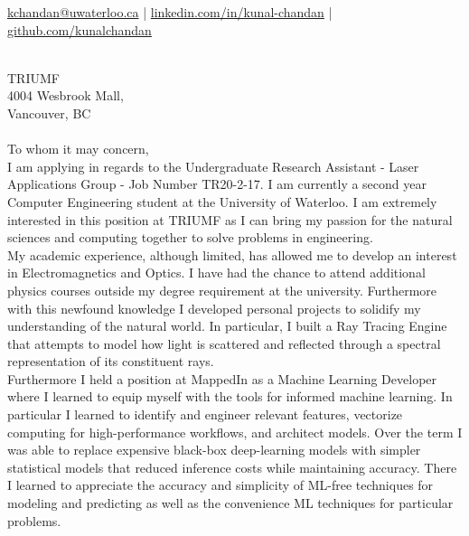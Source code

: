 \documentclass[]{chandan-cv}
\begin{document}
%
%

%
%
{
	\href{mailto:kchandan@uwaterloo.ca}{kchandan@uwaterloo.ca} \qquad
	| \qquad
	\href{https://www.linkedin.com/in/kunal-chandan/}{linkedin.com/in/kunal-chandan} \qquad
	| \qquad
	\href{http://github.com/kunalchandan}{github.com/kunalchandan}
}

\begin{minipage}[t]{0.2\textwidth}
\end{minipage}
\begin{minipage}[t]{0.8\textwidth}
\\
\vspace{10pt}
\large
TRIUMF \\
4004 Wesbrook Mall, \\
Vancouver, BC\\
\\
To whom it may concern,\\


\qquad I am applying in regards to the Undergraduate Research Assistant - Laser Applications Group - Job Number TR20-2-17. 
I am currently a second year Computer Engineering student at the University of Waterloo. 
I am extremely interested in this position at TRIUMF as I can bring my passion for the natural sciences and computing together to solve problems in engineering.
\\


\qquad My academic experience, although limited, has allowed me to develop an interest in Electromagnetics and Optics. 
I have had the chance to attend additional physics courses outside my degree requirement at the university. 
Furthermore with this newfound knowledge I developed personal projects to solidify my understanding of the natural world. 
In particular, I built a Ray Tracing Engine that attempts to model how light is scattered and reflected through a spectral representation of its constituent rays.
\\


\qquad Furthermore I held a position at MappedIn as a Machine Learning Developer where I learned to equip myself with the tools for informed machine learning. 
In particular I learned to identify and engineer relevant features, vectorize computing for high-performance workflows, and architect models. 
Over the term I was able to replace expensive black-box deep-learning models with simpler statistical models that reduced inference costs while maintaining accuracy. 
There I learned to appreciate the accuracy and simplicity of ML-free techniques for modeling and predicting as well as the convenience ML techniques for particular problems. 
\\



\end{minipage}
\end{document}
